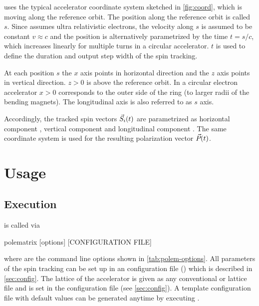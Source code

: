 \documentclass[a4paper]{scrartcl}
\begin{document}
\polem uses the typical accelerator coordinate system sketched in \cref{fig:coord}, which
is moving along the reference orbit. The position along the reference orbit is called $s$.
Since \polem assumes ultra relativistic electrons, the velocity along $s$ is assumed to be
constant $v\approx c$ and the position is alternatively parametrized by the time
$t = s/c$, which increases linearly for multiple turns in a circular accelerator. $t$ is
used to define the duration and output step width of the spin tracking.

At each position $s$ the $x$ axis points in horizontal direction and the $z$ axis points
in vertical direction. $z>0$ is above the reference orbit. In a circular electron
accelerator $x>0$ corresponds to the outer side of the ring (to larger radii of the
bending magnets). The longitudinal axis is also referred to as $s$ axis.

Accordingly, the tracked spin vectors $\svec[i](t)$ are parametrized as horizontal
component \sx, vertical component \sz and longitudinal component \slong. The same
coordinate system is used for the resulting polarization vector $\pvec(t)$.







\section{Usage}
\label{sec:usage}

\subsection{Execution}
\label{sec:execution}

\polem is called via
\begin{bashcode}
  polematrix [options] [CONFIGURATION FILE]
\end{bashcode}
where \bashinline{[options]} are the command line options shown in
\cref{tab:polem-options}. All parameters of the spin tracking can be set up in an \xml
configuration file () which is described in
\cref{sec:config}.
%
The lattice of the accelerator is given as any conventional \ele or \madx lattice file and
is set in the configuration file (see \cref{sec:config}). A template configuration file
with default values can be generated anytime by executing .
\end{document}
